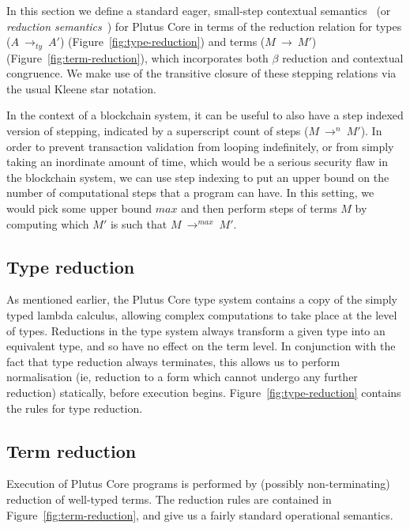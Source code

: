 \documentclass[a4paper]{article}
\newcommand{\typeStep}[2]{#1 ~ \rightarrow_{ty} ~ #2}
\newcommand{\step}[2]{#1 ~ \rightarrow ~ #2}
\newcommand{\multistepIndexed}[3]{#1 ~ \rightarrow^{#2} ~ #3}
\begin{document}
In this section we define a standard eager,
small-step contextual semantics~\cite[5.3]{Harper:PFPL} (or
\textit{reduction semantics}~\cite[\S2]{Felleisen-Hieb}) for Plutus
Core in terms of the reduction relation for types
(\(\typeStep{A}{A'}\)) (Figure~\ref{fig:type-reduction}) 
and terms (\(\step{M}{M'}\)) (Figure~\ref{fig:term-reduction}), which
incorporates both $\beta$ reduction and contextual congruence. We make
use of the transitive closure of these stepping relations via the
usual Kleene star notation.

In the context of a blockchain system, it can be useful to also have a
step indexed version of stepping, indicated by a superscript count of
steps (\(\multistepIndexed{M}{n}{M'}\)). In order to prevent
transaction validation from looping indefinitely, or from simply
taking an inordinate amount of time, which would be a serious security
flaw in the blockchain system, we can use step indexing to put an
upper bound on the number of computational steps that a program can
have. In this setting, we would pick some upper bound $\mathit{max}$
and then perform steps of terms $M$ by computing which $M'$ is such
that \(\multistepIndexed{M}{\mathit{max}}{M'}\).


\newpage 

\subsection{Type reduction}
As mentioned earlier, the Plutus Core type system contains a copy of the 
simply typed lambda calculus, allowing complex computations to take place
at the level of types.  Reductions in the type system always transform
a given type into an equivalent type, and so have no effect on the term
level.  In conjunction with the fact that type reduction always terminates,
this allows us to perform normalisation (ie, reduction to a form which
cannot undergo any further reduction) statically, before execution begins. 
Figure~\ref{fig:type-reduction} contains the rules for type reduction.




\subsection{Term reduction}
Execution of Plutus Core programs is performed by (possibly
non-terminating) reduction of well-typed terms.  The reduction rules
are contained in Figure~\ref{fig:term-reduction}, and give us a fairly
standard operational semantics.
\end{document}

